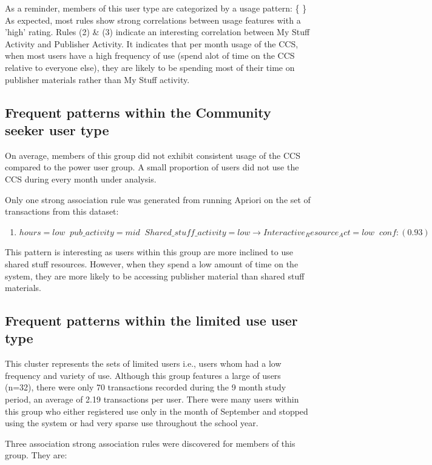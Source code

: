 \documentclass{acm_proc_article-sp}
\begin{document}
As a reminder, members of this user type  are categorized by a usage pattern: \{ \}
As expected, most rules show strong correlations between usage features with a 'high' rating.
Rules (2) \& (3) indicate an interesting correlation between My Stuff Activity and Publisher Activity. It indicates that per month usage of the CCS, when most users have a high frequency of use (spend alot of time on the CCS relative to everyone else), they are likely to be spending most of their time on publisher materials rather than My Stuff activity.

\subsection {Frequent patterns within the Community seeker user type}
On average, members of this group did not exhibit consistent usage of the CCS compared to the power user group. A small proportion of users did not use the CCS during every month under analysis.

Only one strong association rule was generated from running Apriori on the set of transactions from this dataset:

\begin{enumerate}
\item $hours=low \;\; pub\_activity=mid \;\; Shared\_stuff\_activity=low  \longrightarrow Interactive_Resource_Act=low  \;\;  conf:(0.93)$
\end{enumerate}

This pattern is interesting as users within this group are more inclined to use shared stuff resources. However, when they spend a low amount of time on the system, they are more likely to be accessing publisher material than shared stuff materials.

\subsection {Frequent patterns within the limited use user type}
This cluster represents the sets of limited users i.e., users whom had a low frequency and variety of use. 
Although this group features a large of users (n=32), there were only 70 transactions recorded during the 9 month study period, an average of 2.19 transactions per user. There were many users within this group who either registered use only in the month of September and stopped using the system or had very sparse use throughout the school year.

Three association strong association rules were discovered for members of this group. They are:
\end{document}
